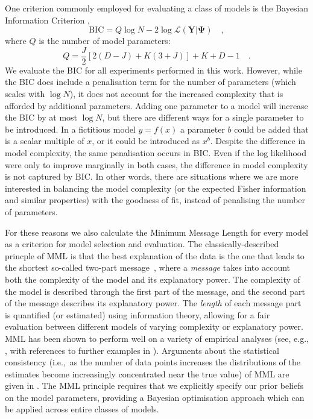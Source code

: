 \documentclass[twocolumn]{aastex62}
\newcommand{\vect}[1]{\boldsymbol{\mathbf{#1}}}
\renewcommand{\vec}[1]{\vect{#1}}
\newcommand{\data}{\textbf{Y}}
\newcommand{\NumDimensions}{D}
\newcommand{\NumLatentFactors}{J}
\newcommand{\NumComponents}{K}
\begin{document}
One criterion commonly employed for evaluating a class of models is the 
Bayesian Information Criterion \citep[BIC;][]{Schwarz:1978}, 
\begin{equation}
	\textrm{BIC} = Q\log{N} - 2\log\mathcal{L}\left(\data|\vec\Psi\right) \quad , \label{eq:bic}
\end{equation} 
\noindent{}where $Q$ is the number of model parameters:
\begin{equation}
	Q = \frac{\NumLatentFactors}{2}\left[2\left(\NumDimensions - \NumLatentFactors\right) + \NumComponents\left(3 + \NumLatentFactors\right)\right] + \NumComponents + \NumDimensions - 1 \quad .
\end{equation}
\noindent{}We evaluate the BIC for all experiments performed in this work.
However, while the BIC does include a penalisation term for the number of
parameters (which scales with $\log{N}$), it does not account for the increased
complexity that is afforded by additional parameters. Adding one parameter
to a model will increase the BIC by at most $\log{N}$, but there are different
ways for a single parameter to be introduced. In a fictitious model $y=f(x)$
a parameter $b$ could be added that is a scalar multiple of $x$, or it could be
introduced as $x^b$. Despite the difference in model complexity, the same
penalisation occurs in BIC. Even if the log likelihood were only to improve
marginally in both cases, the difference in model complexity is not captured
by BIC. In other words, there are situations where we are more interested in
balancing the model complexity (or the expected Fisher information and similar
properties) with the goodness of fit, instead of penalising the number of 
parameters.


For these reasons we also calculate the Minimum Message Length \citep[MML;][]{Wallace:2005}
for every model as a criterion for model selection and evaluation. 
The classically-described princple of MML is that the best explanation of the
data is the one that leads to the shortest so-called two-part message~\citep{Wallace:2005}, 
where a \textit{message} takes into account both the complexity of the model 
and its explanatory power. The complexity of the model is described through
the first part of the message, and the second part of the message describes
its explanatory power. The \emph{length} of each message part is quantified
(or estimated) using information theory, allowing for a fair evaluation between
different models of varying complexity or explanatory power. MML has been 
shown to perform well on a variety of empirical analyses (see, e.g., 
\cite{viswanathan1999finding,fitzgibbon2004minimum}, with references to 
further examples in \cite{Wallace:2005,dowe2007bayes,Dowe2008a,Dowe2011a}).
Arguments about the statistical consistency (i.e.,~as the number of data 
points increases the distributions of the estimates become increasingly 
concentrated near the true value) of MML are given in \cite{DoweWallace1997a,Dowe2011a}.
The MML principle requires that we explicitly specify our prior beliefs on the
model parameters, providing a Bayesian optimisation approach which can be
applied across entire classes of models.
\end{document}

